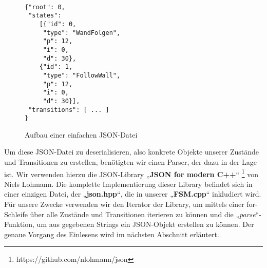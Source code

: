 \begin{figure}[thp]
\begin{lstlisting}[style=json]

{"root": 0,
 "states":
    [{"id": 0,
     "type": "WandFolgen",
     "p": 12,
     "i": 0,
     "d": 30},       
    {"id": 1,
     "type": "FollowWall",
     "p": 12,
     "i": 0,
     "d": 30}],
 "transitions": [ ... ]
}

\end{lstlisting}
\centering
\caption{Aufbau einer einfachen JSON-Datei}
\end{figure}

Um diese JSON-Datei zu deserialisieren, also konkrete Objekte unserer Zustände
und Transitionen zu erstellen, benötigten wir einen Parser, der dazu in der Lage
ist. Wir verwenden hierzu die JSON-Library „\textbf{JSON for modern C++}“ \footnote[1]{https://github.com/nlohmann/json} von Niels
Lohmann.
Die komplette Implementierung dieser Library befindet sich in einer einzigen
Datei, der „\textbf{json.hpp}“, die in unserer „\textbf{FSM.cpp}“ inkludiert wird.
Für unsere Zwecke verwenden wir den Iterator der Library, um mittels einer
for-Schleife über alle Zustände und Transitionen iterieren zu können und die
„\textit{parse}“-Funktion, um aus gegebenen Strings ein JSON-Objekt erstellen zu können.
Der genaue Vorgang des Einlesens wird im nächsten Abschnitt erläutert.
